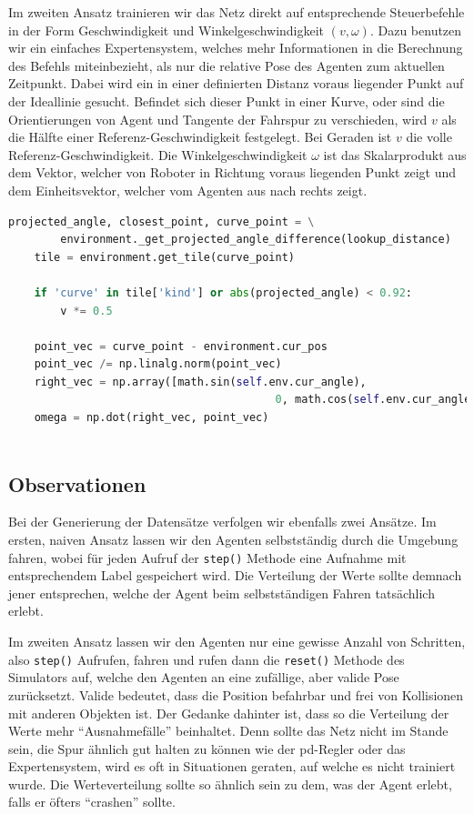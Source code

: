 Im zweiten Ansatz trainieren wir das Netz direkt auf entsprechende Steuerbefehle in der Form Geschwindigkeit und Winkelgeschwindigkeit $(v, \omega)$. Dazu benutzen wir ein einfaches Expertensystem, welches mehr Informationen in die Berechnung des Befehls miteinbezieht, als nur die relative Pose des Agenten zum aktuellen Zeitpunkt. Dabei wird ein in einer definierten Distanz voraus liegender Punkt auf der Ideallinie gesucht. Befindet sich dieser Punkt in einer Kurve, oder sind die Orientierungen von Agent und Tangente der Fahrspur zu verschieden, wird $v$ als die Hälfte einer Referenz-Geschwindigkeit festgelegt. Bei Geraden ist $v$ die volle Referenz-Geschwindigkeit. Die Winkelgeschwindigkeit $\omega$ ist das Skalarprodukt aus dem Vektor, welcher von Roboter in Richtung voraus liegenden Punkt zeigt und dem Einheitsvektor, welcher vom Agenten aus nach rechts zeigt.

\begin{minipage}{\linewidth}
	\begin{lstlisting}[caption={Berechnung eines Steuerbefehls mit einfachem Expertensystem}, language=python]
	projected_angle, closest_point, curve_point = \
		environment._get_projected_angle_difference(lookup_distance)
	tile = environment.get_tile(curve_point)
	
	if 'curve' in tile['kind'] or abs(projected_angle) < 0.92:
		v *= 0.5
	
	point_vec = curve_point - environment.cur_pos
	point_vec /= np.linalg.norm(point_vec)
	right_vec = np.array([math.sin(self.env.cur_angle), 
									     0, math.cos(self.env.cur_angle)])
	omega = np.dot(right_vec, point_vec)
	
	\end{lstlisting}
\end{minipage}

\subsection{Observationen}

Bei der Generierung der Datensätze verfolgen wir ebenfalls zwei Ansätze. Im ersten, naiven Ansatz lassen wir den Agenten selbstständig durch die Umgebung fahren, wobei für jeden Aufruf der \texttt{step()} Methode eine Aufnahme mit entsprechendem Label gespeichert wird. Die Verteilung der Werte sollte demnach jener entsprechen, welche der Agent beim selbstständigen Fahren tatsächlich erlebt.

Im zweiten Ansatz lassen wir den Agenten nur eine gewisse Anzahl von Schritten, also \texttt{step()} Aufrufen, fahren und rufen dann die \texttt{reset()} Methode des Simulators auf, welche den Agenten an eine zufällige, aber valide Pose zurücksetzt. Valide bedeutet, dass die Position befahrbar und frei von Kollisionen mit anderen Objekten ist.
Der Gedanke dahinter ist, dass so die Verteilung der Werte mehr ``Ausnahmefälle'' beinhaltet. Denn sollte das Netz nicht im Stande sein, die Spur ähnlich gut halten zu können wie der \acs{pd}-Regler oder das Expertensystem, wird es oft in Situationen geraten, auf welche es nicht trainiert wurde. Die Werteverteilung sollte so ähnlich sein zu dem, was der Agent erlebt, falls er öfters ``crashen'' sollte.

